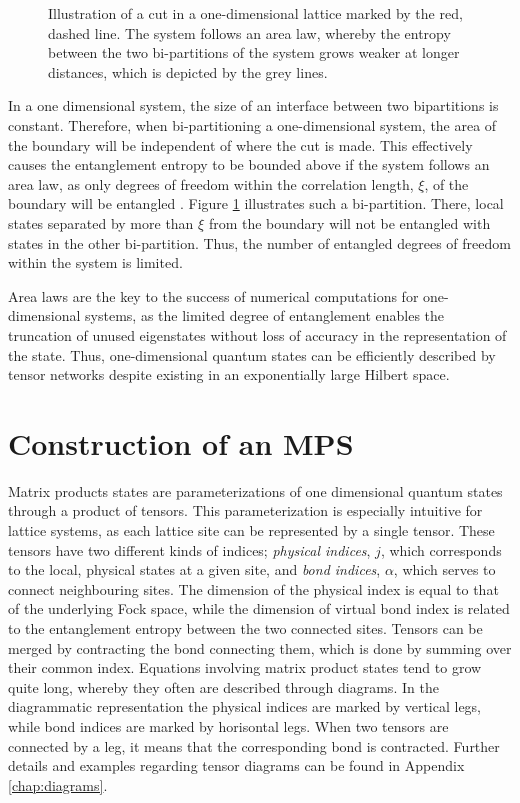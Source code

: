 \begin{figure}[h!]
	\centering
	
	\caption{Illustration of a cut in a one-dimensional lattice marked by the red, dashed line. The system follows an area law, whereby the entropy between the two bi-partitions of the system grows weaker at longer distances, which is depicted by the grey lines. }
	\label{fig:LatticeCut}
\end{figure}

In a one dimensional system, the size of an interface between two bipartitions is constant. Therefore, when bi-partitioning a one-dimensional system, the area of the boundary will be independent of where the cut is made. This effectively causes the entanglement entropy to be bounded above if the system follows an area law, as only degrees of freedom within the correlation length, $\xi$, of the boundary will be entangled \cite{Hastings2007}. Figure \ref{fig:LatticeCut} illustrates such a bi-partition. There, local states separated by more than $\xi$ from the boundary will not be entangled with states in the other bi-partition. Thus, the number of entangled degrees of freedom within the system is limited.

Area laws are the key to the success of numerical computations for one-dimensional systems, as the limited degree of entanglement enables the truncation of unused eigenstates without loss of accuracy in the representation of the state. Thus, one-dimensional quantum states can be efficiently described by tensor networks despite existing in an exponentially large Hilbert space.


\section{Construction of an MPS} \label{sec:construct_MPS}
Matrix products states are parameterizations of one dimensional quantum states through a product of tensors. This parameterization is especially intuitive for lattice systems, as each lattice site can be represented by a single tensor. These tensors have two different kinds of indices; \textit{physical indices}, $j$, which corresponds to the local, physical states at a given site, and \textit{bond indices}, $\alpha$, which serves to connect neighbouring sites.
The dimension of the physical index is equal to that of the underlying Fock space, while the dimension of virtual bond index is related to the entanglement entropy between the two connected sites.
Tensors can be merged by contracting the bond connecting them, which is done by summing over their common index. Equations involving matrix product states tend to grow quite long, whereby they often are described through diagrams. In the diagrammatic representation the physical indices are marked by vertical legs, while bond indices are marked by horisontal legs. When two tensors are connected by a leg, it means that the corresponding bond is contracted. Further details and examples regarding tensor diagrams can be found in Appendix \ref{chap:diagrams}.


